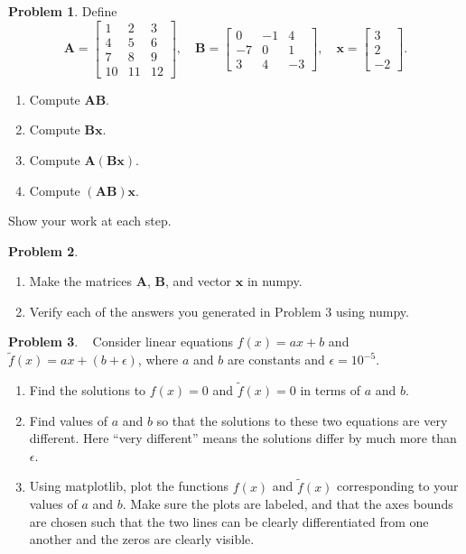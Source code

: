 \documentclass[12pt]{article}
\theoremstyle{definition}
\newtheorem{problem}{Problem}
\renewcommand{\vec}{\mathbf}
\begin{document}
\clearpage

\begin{problem}
Define 
\begin{equation*}
    \vec{A} = \begin{bmatrix} 1 & 2 & 3 \\ 4 & 5 & 6 \\ 7 & 8 & 9 \\ 10 & 11 & 12\end{bmatrix}
    ,\quad
    \vec{B} = \begin{bmatrix} 0 & -1 & 4 \\ -7 & 0 & 1 \\ 3 & 4 & -3\end{bmatrix}
    ,\quad
    \vec{x} = \begin{bmatrix} 3 \\ 2 \\ -2\end{bmatrix}.
\end{equation*}

    \begin{enumerate}
        \item Compute $\vec{A} \vec{B}$.
        \item Compute $\vec{B} \vec{x}$.
        \item Compute $\vec{A} (\vec{B} \vec{x})$.
        \item Compute $(\vec{A}\vec{B}) \vec{x}$.
    \end{enumerate}
Show your work at each step.
\end{problem}

\begin{problem}~
\begin{enumerate}
    \item Make the matrices $\vec{A}$, $\vec{B}$, and vector $\vec{x}$ in numpy.
    \item Verify each of the answers you generated in Problem 3 using numpy. 
\end{enumerate}
\end{problem}

\begin{problem}~
    Consider linear equations $f(x) = a x + b$ and $\tilde{f}(x) = a x + (b+\epsilon)$, where $a$ and $b$ are constants and $\epsilon = 10^{-5}$.
    \begin{enumerate}
        \item Find the solutions to $f(x) = 0$ and $\tilde{f}(x) = 0$ in terms of $a$ and $b$.
        \item Find values of $a$ and $b$ so that the solutions to these two equations are very different. Here ``very different'' means the solutions differ by much more than $\epsilon$.
        \item Using matplotlib, plot the functions $f(x)$ and $\tilde{f}(x)$ corresponding to your values of $a$ and $b$.
        Make sure the plots are labeled, and that the axes bounds are chosen such that the two lines can be clearly differentiated from one another and the zeros are clearly visible.
    \end{enumerate}
\end{problem}
\end{document}
